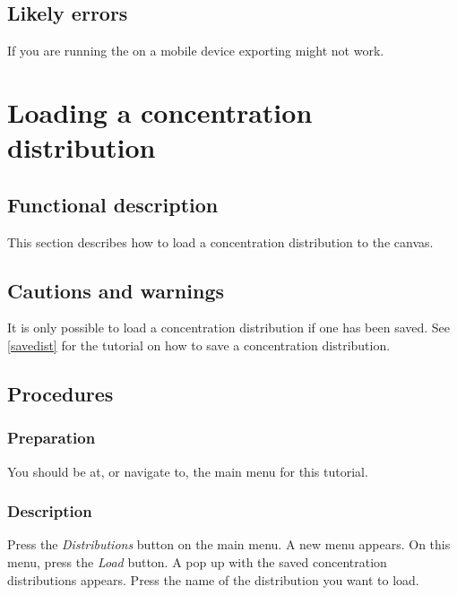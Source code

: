 \subsection{Likely errors}
If you are running the \applicationname on a mobile device exporting might not work.


\section{Loading a concentration distribution}
\label{sec:loadDist}

\subsection{Functional description}
This section describes how to load a concentration distribution to the canvas.

\subsection{Cautions and warnings}
It is only possible to load a concentration distribution if one has been saved. See \ref{savedist} for the tutorial on how to save a concentration distribution.

\subsection{Procedures}
\subsubsection{Preparation}
You should be at, or navigate to, the main menu for this tutorial.

\subsubsection{Description}
Press the \emph{Distributions} button on the main menu. A new menu appears. On this menu, press the \emph{Load} button. A pop up with the saved concentration distributions appears. Press the name of the distribution you want to load.

